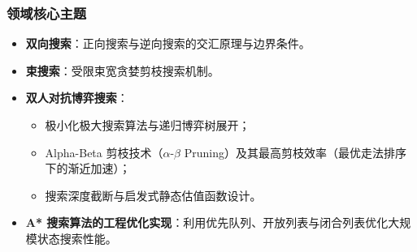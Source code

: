 \subsubsection{领域核心主题}
\begin{itemize}
    \item \textbf{双向搜索}：正向搜索与逆向搜索的交汇原理与边界条件。
    \item \textbf{束搜索}：受限束宽贪婪剪枝搜索机制。
    \item \textbf{双人对抗博弈搜索}：
    \begin{itemize}
        \item 极小化极大搜索算法与递归博弈树展开；
        \item Alpha-Beta 剪枝技术（$\alpha$-$\beta$ Pruning）及其最高剪枝效率（最优走法排序下的渐近加速）；
        \item 搜索深度截断与启发式静态估值函数设计。
    \end{itemize}
    \item \textbf{A* 搜索算法的工程优化实现}：利用优先队列、开放列表与闭合列表优化大规模状态搜索性能。
\end{itemize}

